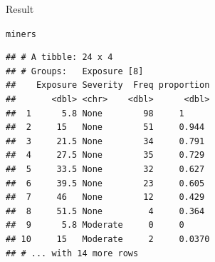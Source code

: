 \documentclass[unknownkeysallowed]{beamer}\usepackage[]{graphicx}\usepackage[]{color}
\makeatletter
\newcommand{\hlopt}[1]{\textcolor[rgb]{0,0,0}{#1}}%
\newcommand{\hlstd}[1]{\textcolor[rgb]{0.345,0.345,0.345}{#1}}%
\newcommand{\hlkwb}[1]{\textcolor[rgb]{0.69,0.353,0.396}{#1}}%
\newcommand{\hlkwc}[1]{\textcolor[rgb]{0.333,0.667,0.333}{#1}}%
\newcommand{\hlkwd}[1]{\textcolor[rgb]{0.737,0.353,0.396}{\textbf{#1}}}%
\newenvironment{kframe}{%
 \def\at@end@of@kframe{}%
 \ifinner\ifhmode%
  \def\at@end@of@kframe{\end{minipage}}%
  \begin{minipage}{\columnwidth}%
 \fi\fi%
 \def\FrameCommand##1{\hskip\@totalleftmargin \hskip-\fboxsep
 \colorbox{shadecolor}{##1}\hskip-\fboxsep
     \hskip-\linewidth \hskip-\@totalleftmargin \hskip\columnwidth}%
 \MakeFramed {\advance\hsize-\width
   \@totalleftmargin\z@ \linewidth\hsize
   \@setminipage}}%
 {\par\unskip\endMakeFramed%
 \at@end@of@kframe}
\newenvironment{knitrout}{}{} %
\makeatother
\begin{document}

\begin{frame}[fragile]{Result}
  
\begin{knitrout}
\color{fgcolor}\begin{kframe}
\begin{alltt}
\hlstd{miners}
\end{alltt}
\begin{verbatim}
## # A tibble: 24 x 4
## # Groups:   Exposure [8]
##    Exposure Severity  Freq proportion
##       <dbl> <chr>    <dbl>      <dbl>
##  1      5.8 None        98     1     
##  2     15   None        51     0.944 
##  3     21.5 None        34     0.791 
##  4     27.5 None        35     0.729 
##  5     33.5 None        32     0.627 
##  6     39.5 None        23     0.605 
##  7     46   None        12     0.429 
##  8     51.5 None         4     0.364 
##  9      5.8 Moderate     0     0     
## 10     15   Moderate     2     0.0370
## # ... with 14 more rows
\end{verbatim}
\end{kframe}
\end{knitrout}
  
\end{frame}
\end{document}
